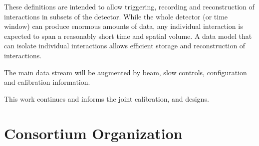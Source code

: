 These definitions are intended to allow triggering, recording and reconstruction of interactions in subsets of the detector. While the whole detector (or time window) can produce enormous amounts of data, any individual interaction is expected to span a reasonably short time and spatial volume. A data model that can isolate individual interactions  allows efficient storage and reconstruction of interactions. 


The main data stream will be augmented by beam, slow controls,  configuration and calibration information. 

This work continues and informs  the  joint  calibration,  and  designs.


\section{Consortium Organization}













